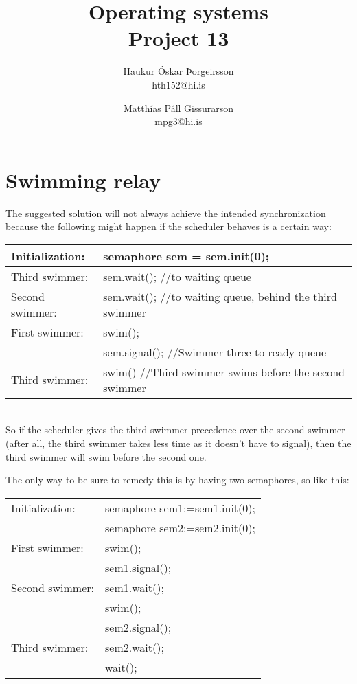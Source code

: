 \documentclass[10pt,a4paper]{article}
\begin{document}
\title{Operating systems\\Project 13}
\author{
    Haukur Óskar Þorgeirsson\\
    hth152@hi.is \and
    Matthías Páll Gissurarson\\
    mpg3@hi.is}
\maketitle

\section{Swimming relay}

The suggested solution will not always achieve the intended synchronization because the following might happen if the scheduler behaves is a certain way:\\

\begin{tabular}{|ll|}
\hline
Initialization:&semaphore sem = sem.init(0);\\
\hline
Third swimmer:&sem.wait(); //to waiting queue\\ \hline
Second swimmer:&sem.wait(); //to waiting queue, behind the third swimmer\\ \hline
First swimmer:&swim();\\
&sem.signal(); //Swimmer three to ready queue\\ \hline
Third swimmer:&swim() //Third swimmer swims before the second swimmer\\ \hline
\end{tabular}\\

So if the scheduler gives the third swimmer precedence over the second swimmer (after all, the third swimmer takes less time as it doesn't have to signal), then the third swimmer will swim before the second one.

The only way to be sure to remedy this is by having two semaphores, so like this:\\

\begin{tabular}{|ll|} \hline
Initialization:	&semaphore sem1:=sem1.init(0);\\
                &semaphore sem2:=sem2.init(0);\\ \hline
First swimmer:  &swim();\\
                &sem1.signal();\\ \hline
Second swimmer: &sem1.wait();\\
                &swim();\\
                &sem2.signal();\\ \hline
Third swimmer:  &sem2.wait();\\
                &wait();\\ \hline
\end{tabular}
\newpage
\end{document}
